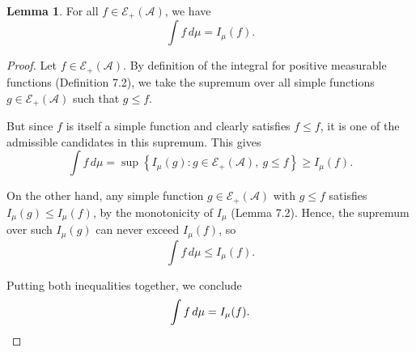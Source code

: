 \documentclass[12pt]{article}
\theoremstyle{definition}
\newtheorem{lemma}[theorem]{Lemma}
\begin{document}
\medskip
\begin{lemma}
For all \( f \in \mathcal{E}_+(\mathcal{A}) \), we have
\[
\int f \, d\mu = I_\mu(f).
\]
\end{lemma}

\begin{proof}
Let \( f \in \mathcal{E}_+(\mathcal{A}) \). By definition of the integral for positive measurable functions (Definition 7.2), we take the supremum over all simple functions \( g \in \mathcal{E}_+(\mathcal{A}) \) such that \( g \leq f \).

But since \( f \) is itself a simple function and clearly satisfies \( f \leq f \), it is one of the admissible candidates in this supremum. This gives
\[
\int f \, d\mu = \sup \left\{ I_\mu(g) : g \in \mathcal{E}_+(\mathcal{A}),\ g \leq f \right\} \geq I_\mu(f).
\]

On the other hand, any simple function \( g \in \mathcal{E}_+(\mathcal{A}) \) with \( g \leq f \) satisfies \( I_\mu(g) \leq I_\mu(f) \), by the monotonicity of \( I_\mu \) (Lemma 7.2). Hence, the supremum over such \( I_\mu(g) \) can never exceed \( I_\mu(f) \), so
\[
\int f \, d\mu \leq I_\mu(f).
\]

Putting both inequalities together, we conclude
\[
\int f \, d\mu = I_\mu(f). \qedhere
\]
\end{proof}
\end{document}
